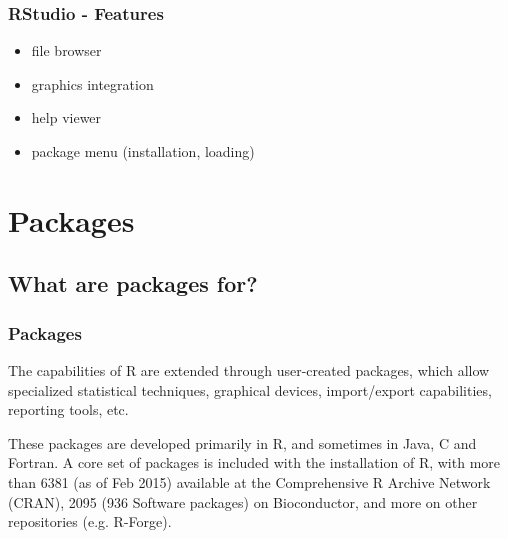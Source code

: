 \documentclass[xcolor={table},c]{beamer}
\begin{document}
\begin{frame}\frametitle{RStudio - Features}
  \begin{itemize}
    \item file browser
    \item graphics integration
    \item help viewer
    \item package menu (installation, loading)
  \end{itemize}
\begin{center}
\end{center}
\end{frame}



\section{Packages}
\subsection{What are packages for?}

\begin{frame}[shrink=5]\frametitle{Packages}
  The capabilities of R are extended through user-created packages, which allow specialized statistical techniques, graphical devices, import/export capabilities, reporting tools, etc. \newline

These packages are developed primarily in R, and sometimes in Java, C and Fortran. A core set of packages is included with the installation of R, with more than 6381 (as of Feb 2015) available at the Comprehensive R Archive Network (CRAN), 2095 (936 Software packages) on Bioconductor, and more on other repositories (e.g. R-Forge).
\begin{center}
\end{center}
\end{frame}
\end{document}

